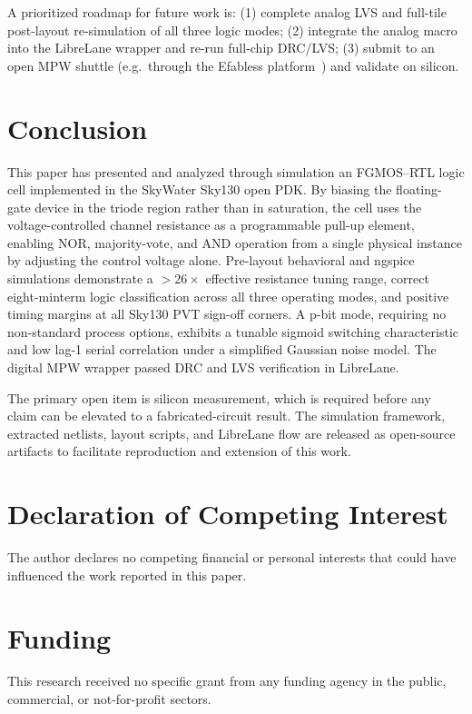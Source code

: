 \documentclass[a4paper,fleqn]{cas-sc}
\begin{document}
A prioritized roadmap for future work is: (1) complete analog LVS and full-tile
post-layout re-simulation of all three logic modes; (2) integrate the analog macro
into the LibreLane wrapper and re-run full-chip DRC/LVS; (3) submit to an open MPW
shuttle (e.g.\ through the Efabless platform~\cite{EfablessMPW}) and validate on
silicon.

\section{Conclusion}
\label{sec:concl}

This paper has presented and analyzed through simulation an FGMOS--RTL logic cell
implemented in the SkyWater Sky130 open PDK. By biasing the floating-gate device in
the triode region rather than in saturation, the cell uses the voltage-controlled
channel resistance as a programmable pull-up element, enabling NOR, majority-vote, and
AND operation from a single physical instance by adjusting the control voltage alone.
Pre-layout behavioral and ngspice simulations demonstrate a $>$$26\times$ effective
resistance tuning range, correct eight-minterm logic classification across all three
operating modes, and positive timing margins at all Sky130 PVT sign-off corners.
A p-bit mode, requiring no non-standard process options, exhibits a tunable sigmoid
switching characteristic and low lag-1 serial correlation under a simplified Gaussian
noise model. The digital MPW wrapper passed DRC and LVS verification in LibreLane.

The primary open item is silicon measurement, which is required before any claim can
be elevated to a fabricated-circuit result. The simulation framework, extracted
netlists, layout scripts, and LibreLane flow are released as open-source artifacts to
facilitate reproduction and extension of this work.

\section*{Declaration of Competing Interest}
The author declares no competing financial or personal interests that could have
influenced the work reported in this paper.

\section*{Funding}
This research received no specific grant from any funding agency in the public,
commercial, or not-for-profit sectors.
\end{document}
